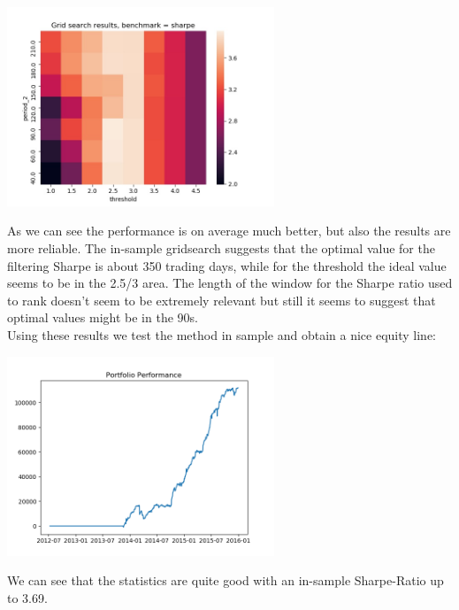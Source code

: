 \begin{center}
	\centering
	\includegraphics[width=0.6\textwidth]{GridSearches/Sharpe_Ranking/Figure_3.jpeg}
	\label{Sharpe_Ranking_3}
\end{center}

As we can see the performance is on average much better, but also the results are more reliable. The in-sample gridsearch suggests that the optimal value for the filtering Sharpe is about 350 trading days, while for the threshold the ideal value seems to be in the 2.5/3 area. The length of the window for the Sharpe ratio used to rank doesn't seem to be extremely relevant but still it seems  to suggest that optimal values might be in the 90s.\\
Using these results we test the method in sample and obtain a nice equity line:

\begin{center}
	\centering
	\includegraphics[width=0.6\textwidth]{GridSearches/Sharpe_Ranking/In_Sample_performance.png}
	\label{Sharpe_Ranking_in_sample}
\end{center}

We can see that the statistics are quite good with an in-sample Sharpe-Ratio up to 3.69.

